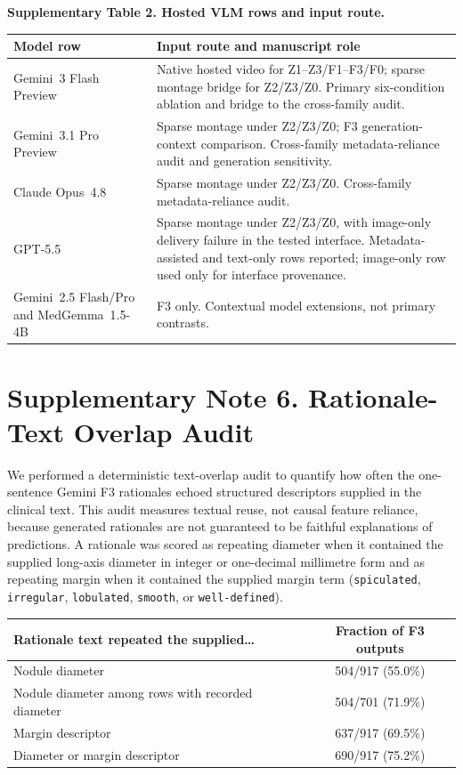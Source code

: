 \documentclass[11pt]{article}
\begin{document}
\begin{center}
\small
{}
\noindent\textbf{Supplementary Table 2. Hosted VLM rows and input route.}\par\vspace{3pt}
\begin{tabularx}{\textwidth}{@{}p{}Y@{}}
\toprule
Model row & Input route and manuscript role \\
\midrule
Gemini~3 Flash Preview & Native hosted video for Z1--Z3/F1--F3/F0; sparse
montage bridge for Z2/Z3/Z0. Primary six-condition ablation and bridge to the
cross-family audit. \\
Gemini~3.1 Pro Preview & Sparse montage under Z2/Z3/Z0; F3 generation-context
comparison. Cross-family metadata-reliance audit and generation sensitivity. \\
Claude Opus~4.8 & Sparse montage under Z2/Z3/Z0. Cross-family
metadata-reliance audit. \\
GPT-5.5 & Sparse montage under Z2/Z3/Z0, with image-only delivery failure in the
tested interface. Metadata-assisted and text-only rows reported; image-only row
used only for interface provenance. \\
Gemini~2.5 Flash/Pro and MedGemma~1.5-4B & F3 only. Contextual model
extensions, not primary contrasts. \\
\bottomrule
\end{tabularx}
\end{center}

\section*{Supplementary Note 6. Rationale-Text Overlap Audit}

We performed a deterministic text-overlap audit to quantify how often the
one-sentence Gemini F3 rationales echoed structured descriptors supplied in the
clinical text. This audit measures textual reuse, not causal feature reliance,
because generated rationales are not guaranteed to be faithful explanations of
predictions. A rationale was scored as repeating diameter when it contained the
supplied long-axis diameter in integer or one-decimal millimetre form and as
repeating margin when it contained the supplied margin term
(\texttt{spiculated}, \texttt{irregular}, \texttt{lobulated},
\texttt{smooth}, or \texttt{well-defined}).

\begin{center}
\small
{}
\begin{tabular}{@{}lc@{}}
\toprule
Rationale text repeated the supplied\ldots & Fraction of F3 outputs \\
\midrule
Nodule diameter & 504/917 (55.0\%) \\
Nodule diameter among rows with recorded diameter & 504/701 (71.9\%) \\
Margin descriptor & 637/917 (69.5\%) \\
Diameter or margin descriptor & 690/917 (75.2\%) \\
\bottomrule
\end{tabular}
\end{center}
\end{document}
